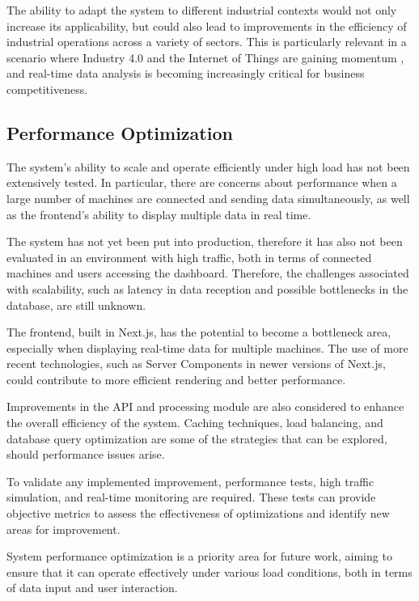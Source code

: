 The ability to adapt the system to different industrial contexts would not only increase its applicability, but could also lead to improvements in the efficiency of industrial operations across a variety of sectors. This is particularly relevant in a scenario where Industry 4.0 and the Internet of Things are gaining momentum \cite{nagy2018roleImpact}, and real-time data analysis is becoming increasingly critical \cite{glowalla2014processDriven} for business competitiveness.

\subsection{Performance Optimization}

The system's ability to scale and operate efficiently under high load has not been extensively tested. In particular, there are concerns about performance when a large number of machines are connected and sending data simultaneously, as well as the frontend's ability to display multiple data in real time.

The system has not yet been put into production, therefore it has also not been evaluated in an environment with high traffic, both in terms of connected machines and users accessing the dashboard. Therefore, the challenges associated with scalability, such as latency in data reception and possible bottlenecks in the database, are still unknown.

The frontend, built in Next.js, has the potential to become a bottleneck area, especially when displaying real-time data for multiple machines. The use of more recent technologies, such as Server Components in newer versions of Next.js, could contribute to more efficient rendering and better performance.

Improvements in the \gls{API} and processing module are also considered to enhance the overall efficiency of the system. Caching techniques, load balancing, and database query optimization are some of the strategies that can be explored, should performance issues arise.

To validate any implemented improvement, performance tests, high traffic simulation, and real-time monitoring are required. These tests can provide objective metrics to assess the effectiveness of optimizations and identify new areas for improvement.

System performance optimization is a priority area for future work, aiming to ensure that it can operate effectively under various load conditions, both in terms of data input and user interaction.

